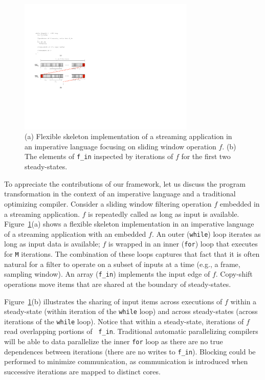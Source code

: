 \begin{figure}[t]
\centering
\includegraphics[width=3.3in]{figures/early-example.pdf}
\caption{(a) Flexible skeleton implementation of a streaming
  application in an imperative language focusing on sliding window
  operation $f$. (b) The elements of {\tt f\_in} inspected by
  iterations of $f$ for the first two steady-states.
\label{fig:comparison}}
\vspace{-10pt}
\end{figure}

To appreciate the contributions of our framework, let us discuss the
program transformation in the context of an imperative language and a
traditional optimizing compiler.  Consider a sliding window filtering
operation $f$ embedded in a streaming application.  $f$ is repeatedly
called as long as input is available.  Figure~\ref{fig:comparison}(a)
shows a flexible skeleton implementation in an imperative language of
a streaming application with an embedded $f$.  An outer ({\tt while})
loop iterates as long as input data is available; $f$ is wrapped in an
inner ({\tt for}) loop that executes for {\tt M} iterations.  The
combination of these loops captures that fact that it is often natural
for a filter to operate on a subset of inputs at a time (e.g., a
frame, sampling window). An array ({\tt f\_in}) implements the input
edge of $f$.  Copy-shift operations move items that are shared at the
boundary of steady-states.

Figure~\ref{fig:comparison}(b) illustrates the sharing of input items
across executions of $f$ within a steady-state (within iteration of the
{\tt while} loop) and across steady-states (across iterations of the
{\tt while} loop).  Notice that within a
steady-state, iterations of $f$ read overlapping portions of {\tt
  f\_in}.  Traditional automatic parallelizing compilers will be able
to data parallelize the inner {\tt for} loop as there are no true
dependences between iterations (there are no writes to {\tt f\_in}).
Blocking could be performed to minimize communication, as
communication is introduced when successive iterations are mapped to
distinct cores.  

